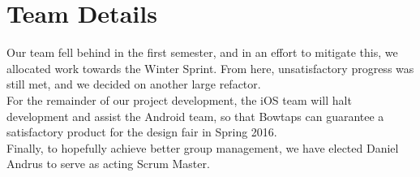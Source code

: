 \documentclass[11pt]{article}
\begin{document}
\section*{Team Details}
Our team fell behind in the first semester, and in an effort to mitigate this, we allocated work towards the Winter Sprint. From here, unsatisfactory progress was still met, and we decided on another large refactor.\\

For the remainder of our project development, the iOS team will halt development and assist the Android team, so that Bowtaps can guarantee a satisfactory product for the design fair in Spring 2016.\\

Finally, to hopefully achieve better group management, we have elected Daniel Andrus to serve as acting Scrum Master.
\end{document}

